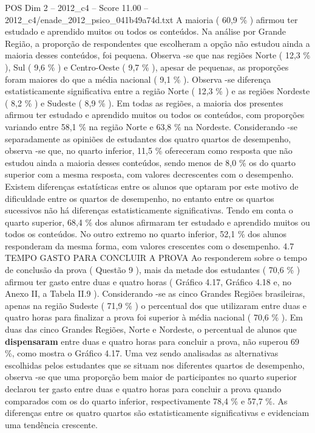 \begin{textsample}{POS Dim 2 – 2012\_c4 – Score 11.00 – 2012\_c4/enade\_2012\_psico\_041b49a74d.txt}
A maioria ( 60,9 \% ) afirmou ter estudado e aprendido muitos ou todos os conteúdos.
Na análise por Grande Região, a proporção de respondentes que escolheram a opção não estudou ainda a maioria desses conteúdos, foi pequena.
Observa -se que nas regiões Norte ( 12,3 \% ), Sul ( 9,6 \% ) e Centro-Oeste ( 9,7 \% ), apesar de pequenas, as proporções foram maiores do que a média nacional ( 9,1 \% ).
Observa -se diferença estatisticamente significativa entre a região Norte ( 12,3 \% ) e as regiões Nordeste ( 8,2 \% ) e Sudeste ( 8,9 \% ).
Em todas as regiões, a maioria dos presentes afirmou ter estudado e aprendido muitos ou todos os conteúdos, com proporções variando entre 58,1 \% na região Norte e 63,8 \% na Nordeste.
Considerando -se separadamente as opiniões de estudantes dos quatro quartos de desempenho, observa -se que, no quarto inferior, 11,5 \% ofereceram como resposta que não estudou ainda a maioria desses conteúdos, sendo menos de 8,0 \% os do quarto superior com a mesma resposta, com valores decrescentes com o desempenho.
Existem diferenças estatísticas entre os alunos que optaram por este motivo de dificuldade entre os quartos de desempenho, no entanto entre os quartos sucessivos não há diferenças estatisticamente significativas.
Tendo em conta o quarto superior, 68,4 \% dos alunos afirmaram ter estudado e aprendido muitos ou todos os conteúdos.
No outro extremo no quarto inferior, 52,1 \% dos alunos responderam da mesma forma, com valores crescentes com o desempenho. 4.7 TEMPO GASTO PARA CONCLUIR A PROVA Ao responderem sobre o tempo de conclusão da prova ( Questão 9 ), mais da metade dos estudantes ( 70,6 \% ) afirmou ter gasto entre duas e quatro horas ( Gráfico 4.17, Gráfico 4.18 e, no Anexo II, a Tabela II.9 ).
Considerando -se as cinco Grandes Regiões brasileiras, apenas na região Sudeste ( 71,9 \% ) o percentual dos que utilizaram entre duas e quatro horas para finalizar a prova foi superior à média nacional ( 70,6 \% ).
Em duas das cinco Grandes Regiões, Norte e Nordeste, o percentual de alunos que \textbf{dispensaram} entre duas e quatro horas para concluir a prova, não superou 69 \%, como mostra o Gráfico 4.17.
Uma vez sendo analisadas as alternativas escolhidas pelos estudantes que se situam nos diferentes quartos de desempenho, observa -se que uma proporção bem maior de participantes no quarto superior declarou ter gasto entre duas e quatro horas para concluir a prova quando comparados com os do quarto inferior, respectivamente 78,4 \% e 57,7 \%.
As diferenças entre os quatro quartos são estatisticamente significativas e evidenciam uma tendência crescente.

\end{textsample}
